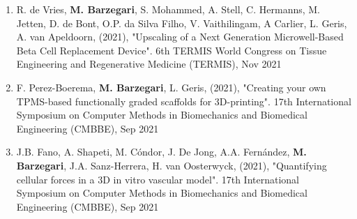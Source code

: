 \documentclass{cv}
\begin{document}
\begin{enumerate}
\item
R. de Vries, \textbf{M. Barzegari}, S. Mohammed, A. Stell, C. Hermanns, M. Jetten, D. de Bont, O.P. da Silva Filho, V. Vaithilingam, A Carlier, L. Geris, A. van Apeldoorn, (2021), "Upscaling of a Next Generation Microwell-Based Beta Cell Replacement Device". 6th TERMIS World Congress on Tissue Engineering and Regenerative Medicine (TERMIS), Nov 2021
\item
F. Perez-Boerema, \textbf{M. Barzegari}, L. Geris, (2021), "Creating your own TPMS-based functionally graded scaffolds for 3D-printing". 17th International Symposium on Computer Methods in Biomechanics and Biomedical Engineering (CMBBE), Sep 2021
\item
J.B. Fano, A. Shapeti, M. Cóndor, J. De Jong, A.A. Fernández, \textbf{M. Barzegari}, J.A. Sanz-Herrera, H. van Oosterwyck, (2021), "Quantifying cellular forces in a 3D in vitro vascular model". 17th International Symposium on Computer Methods in Biomechanics and Biomedical Engineering (CMBBE), Sep 2021
\end{enumerate}
\end{document}
